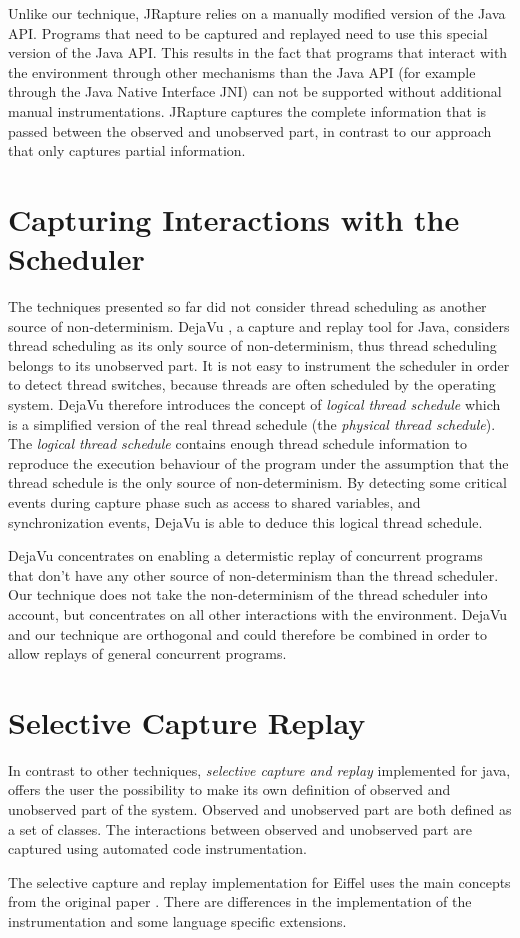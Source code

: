 Unlike our technique, JRapture relies on a manually modified version of the Java API. Programs that need to be captured and replayed need to use this special version of the Java API.  This results in the fact that programs that interact with the environment through other mechanisms than the Java API (for example through the Java Native Interface JNI) can not be supported without additional manual instrumentations. JRapture captures the complete information that is passed between the observed and unobserved part, in contrast to our approach that only captures partial information.

\section {Capturing Interactions with the Scheduler}
The techniques presented so far did not consider thread scheduling as another source of non-determinism. DejaVu \cite{dejavu}, a capture and replay tool for Java, considers thread scheduling as its only source of non-determinism, thus thread scheduling belongs to its unobserved part. It is not easy to instrument the scheduler in order to detect thread switches, because threads are often scheduled by the operating system. DejaVu therefore introduces the concept of \emph{logical thread schedule} which is a simplified version of the real thread schedule (the \emph{physical thread schedule}). The \emph{logical thread schedule} contains enough thread schedule information to reproduce the execution behaviour of the program under the assumption that the thread schedule is the only source of non-determinism. By detecting some critical events during capture phase such as access to shared variables, and synchronization events, DejaVu is able to deduce this logical thread schedule.

DejaVu concentrates on enabling a determistic replay of concurrent programs that don't have any other source of non-determinism than the thread scheduler. Our technique does not take the non-determinism of the thread scheduler into account, but concentrates on all other interactions with the environment. DejaVu and our technique are orthogonal and could therefore be combined in order to allow replays of general concurrent programs. 

\section{Selective Capture Replay}
In contrast to other techniques, \emph{selective capture and replay} \cite{orso05may} implemented for java, offers the user the possibility to make its own definition of observed and unobserved part of the system. Observed and unobserved part are both defined as a set of classes. The interactions between observed and unobserved part are captured using automated code instrumentation.

The selective capture and replay implementation for Eiffel uses the main concepts from the original paper \cite{orso05may}. There are differences in the implementation of the instrumentation and some language specific extensions.
